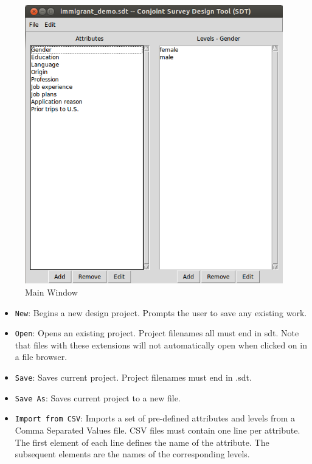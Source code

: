 \documentclass[12pt]{article}
\begin{document}
\begin{figure}[ht!]
\centering\includegraphics[scale=.6]{graphics/main_window.png}
\caption{Main Window}
\end{figure}

\begin{itemize}
\item \texttt{New}: Begins a new design project. Prompts the user to save any existing work.
\item \texttt{Open}: Opens an existing project. Project filenames all must end in sdt. Note that files with these extensions will not automatically open when clicked on in a file browser.
\item \texttt{Save}: Saves current project. Project filenames must end in .sdt.
\item \texttt{Save As}: Saves current project to a new file.
\item \texttt{Import from CSV}: Imports a set of pre-defined attributes and levels from a Comma Separated Values file. CSV files must contain one line per attribute. The first element of each line defines the name of the attribute. The subsequent elements are the names of the corresponding levels.
\end{itemize}
\end{document}
